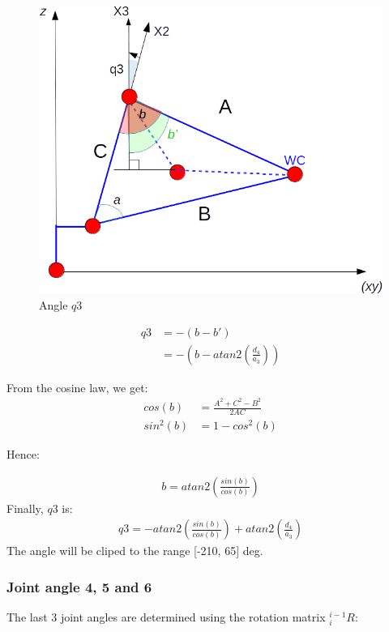\documentclass[a4paper,12pt]{report}
\begin{document}
\begin{figure}[H]
\centering
        \includegraphics[totalheight=7cm]{imgs/q3.png}
        \caption{Angle $q3$}
        \label{fig:q1}
\end{figure}

\begin{align}
q3 &= - (b - b') \\
&= - \left( b - atan2 \left( \frac{d_4}{a_3} \right) \right)
\end{align}

From the cosine law, we get:
\begin{align}
cos(b) &= \frac{A^2 + C^2 - B^2}{2 AC} \\
sin^2(b) &= 1 - cos^2(b)
\end{align}

Hence:

\begin{align}
b = atan2\left( \frac{sin(b)}{cos(b)}\right) 
\end{align}
Finally, $q3$ is:
\begin{align}
q3 = - atan2\left( \frac{sin(b)}{cos(b)}\right)  + atan2 \left( \frac{d_4}{a_3} \right)
\end{align}
The angle will be cliped to the range [-210, 65] deg.



\subsubsection{Joint angle 4, 5 and 6}
The last 3 joint angles are determined using the rotation matrix $_i ^{i-1} R$:
\end{document}
